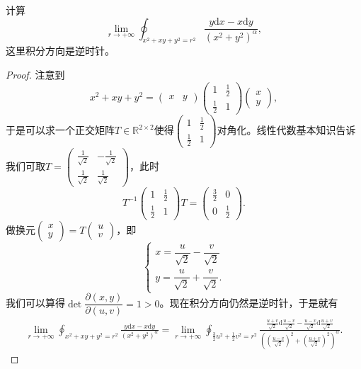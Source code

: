 \documentclass[../../main.tex]{subfiles}%
\begin{document}
\begin{example}
计算
\[
\lim_{r\to+\infty}\oint_{x^2+xy+y^2=r^2}\frac{y\mathrm{d}x-x\mathrm{d}y}{(x^2+y^2)^\alpha},
\]
这里积分方向是逆时针。
\end{example}
\begin{proof}
注意到
\[
x^2+xy+y^2=\begin{pmatrix}x & y\end{pmatrix}\begin{pmatrix}1 & \frac12\\[4pt]\frac12 & 1\end{pmatrix}\begin{pmatrix}x\\y\end{pmatrix},
\]
于是可以求一个正交矩阵$T\in\mathbb{R}^{2\times2}$使得$\begin{pmatrix}1 & \frac12\\\frac12 & 1\end{pmatrix}$对角化。线性代数基本知识告诉我们可取$T=\begin{pmatrix}\frac1{\sqrt2} & -\frac1{\sqrt2}\\[4pt]\frac1{\sqrt2} & \frac1{\sqrt2}\end{pmatrix}$，此时
\[
T^{-1}\begin{pmatrix}1 & \frac12\\\frac12 & 1\end{pmatrix}T=\begin{pmatrix}\frac32 & 0\\0 & \frac12\end{pmatrix}.
\]
做换元$\begin{pmatrix}x\\y\end{pmatrix}=T\begin{pmatrix}u\\v\end{pmatrix}$，即
\[
\begin{cases}
x=\dfrac{u}{\sqrt2}-\dfrac{v}{\sqrt2}\\[4pt]
y=\dfrac{u}{\sqrt2}+\dfrac{v}{\sqrt2}.
\end{cases}
\]
我们可以算得$\det \dfrac{\partial(x,y)}{\partial(u,v)}=1>0$。现在积分方向仍然是逆时针，于是就有
\begin{align*}
\lim_{r\to+\infty}\oint_{x^2+xy+y^2=r^2}\frac{y\mathrm{d}x-x\mathrm{d}y}{(x^2+y^2)^\alpha}
=\lim_{r\to+\infty}\oint_{\frac32u^2+\frac12v^2=r^2}\frac{\frac{u+v}{\sqrt2}\mathrm{d}\frac{u-v}{\sqrt2}-\frac{u-v}{\sqrt2}\mathrm{d}\frac{u+v}{\sqrt2}}{\left(\left(\frac{u-v}{\sqrt2}\right)^2+\left(\frac{u+v}{\sqrt2}\right)^2\right)^\alpha}.

\end{align*}
\end{proof}
\end{document}
